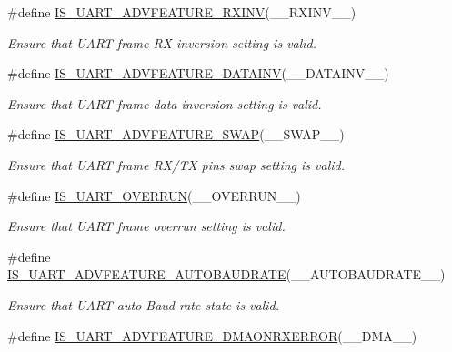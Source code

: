 \begin{DoxyCompactItemize}
\#define \hyperlink{group___u_a_r_t___private___macros_ga7f53ad0eca57b7ffabcae9007b7bbfa6}{I\+S\+\_\+\+U\+A\+R\+T\+\_\+\+A\+D\+V\+F\+E\+A\+T\+U\+R\+E\+\_\+\+R\+X\+I\+NV}(\+\_\+\+\_\+\+R\+X\+I\+N\+V\+\_\+\+\_\+)
\begin{DoxyCompactList}\small\item\em Ensure that U\+A\+RT frame RX inversion setting is valid. \end{DoxyCompactList}\item 
\#define \hyperlink{group___u_a_r_t___private___macros_ga8f6cd85ae5ce7f8dd0ed9227ef5154f6}{I\+S\+\_\+\+U\+A\+R\+T\+\_\+\+A\+D\+V\+F\+E\+A\+T\+U\+R\+E\+\_\+\+D\+A\+T\+A\+I\+NV}(\+\_\+\+\_\+\+D\+A\+T\+A\+I\+N\+V\+\_\+\+\_\+)
\begin{DoxyCompactList}\small\item\em Ensure that U\+A\+RT frame data inversion setting is valid. \end{DoxyCompactList}\item 
\#define \hyperlink{group___u_a_r_t___private___macros_gaf095ad39d3035f722c6976921a84dbea}{I\+S\+\_\+\+U\+A\+R\+T\+\_\+\+A\+D\+V\+F\+E\+A\+T\+U\+R\+E\+\_\+\+S\+W\+AP}(\+\_\+\+\_\+\+S\+W\+A\+P\+\_\+\+\_\+)
\begin{DoxyCompactList}\small\item\em Ensure that U\+A\+RT frame R\+X/\+TX pins swap setting is valid. \end{DoxyCompactList}\item 
\#define \hyperlink{group___u_a_r_t___private___macros_ga57b4229ecb4387a0bb9137fed8de13b8}{I\+S\+\_\+\+U\+A\+R\+T\+\_\+\+O\+V\+E\+R\+R\+UN}(\+\_\+\+\_\+\+O\+V\+E\+R\+R\+U\+N\+\_\+\+\_\+)
\begin{DoxyCompactList}\small\item\em Ensure that U\+A\+RT frame overrun setting is valid. \end{DoxyCompactList}\item 
\#define \hyperlink{group___u_a_r_t___private___macros_ga7318c3e5c175b896444697a0a9407b2f}{I\+S\+\_\+\+U\+A\+R\+T\+\_\+\+A\+D\+V\+F\+E\+A\+T\+U\+R\+E\+\_\+\+A\+U\+T\+O\+B\+A\+U\+D\+R\+A\+TE}(\+\_\+\+\_\+\+A\+U\+T\+O\+B\+A\+U\+D\+R\+A\+T\+E\+\_\+\+\_\+)
\begin{DoxyCompactList}\small\item\em Ensure that U\+A\+RT auto Baud rate state is valid. \end{DoxyCompactList}\item 
\#define \hyperlink{group___u_a_r_t___private___macros_ga15b46dfa0d80a4583864a31da73e3c99}{I\+S\+\_\+\+U\+A\+R\+T\+\_\+\+A\+D\+V\+F\+E\+A\+T\+U\+R\+E\+\_\+\+D\+M\+A\+O\+N\+R\+X\+E\+R\+R\+OR}(\+\_\+\+\_\+\+D\+M\+A\+\_\+\+\_\+)

\end{DoxyCompactItemize}
